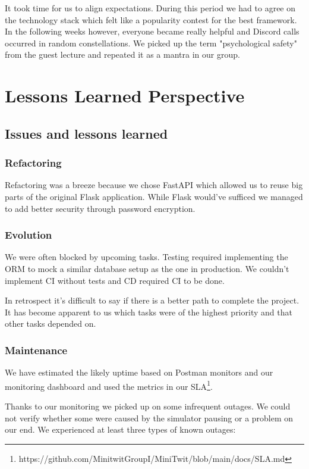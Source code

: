 \documentclass{article}
\begin{document}
It took time for us to align expectations. During this period we had to agree on the technology stack which felt like a popularity contest for the best framework. In the following weeks however, everyone became really helpful and Discord calls occurred in random constellations. We picked up the term "psychological safety" from the guest lecture and repeated it as a mantra in our group.

\section{Lessons Learned Perspective}

\subsection{Issues and lessons learned}

\subsubsection{Refactoring} 

Refactoring was a breeze because we chose FastAPI which allowed us to reuse big parts of the original Flask application. While Flask would've sufficed we managed to add better security through password encryption. 

\subsubsection{Evolution}

We were often blocked by upcoming tasks. Testing required implementing the ORM to mock a similar database setup as the one in production. We couldn't implement CI without tests and CD required CI to be done. 

In retrospect it's difficult to say if there is a better path to complete the project. It has become apparent to us which tasks were of the highest priority and that other tasks depended on. 

\subsubsection{Maintenance}

We have estimated the likely uptime based on Postman monitors and our monitoring dashboard and used the metrics in our SLA\footnote{https://github.com/MinitwitGroupI/MiniTwit/blob/main/docs/SLA.md}. 

Thanks to our monitoring we picked up on some infrequent outages. We could not verify whether some were caused by the simulator pausing or a problem on our end. We experienced at least three types of known outages:
\end{document}
